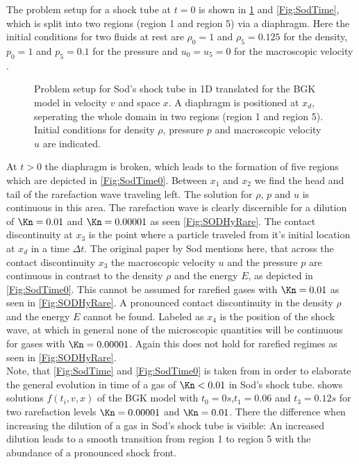 The problem setup for a shock tube at \(t=0\) is shown in \cref{Fig:SodProbSetup} and \cref{Fig:SodTime}, which is split into two regions (region 1 and region 5) via a diaphragm. Here the initial conditions for two fluids at rest are \(\rho_0 = 1\) and \(\rho_5=0.125\) for the density, \(p_0=1\) and \(p_5=0.1\) for the pressure and \(u_0=u_5=0\) for the macroscopic velocity \cite{Sod}.
\begin{figure}[H]
	\centering
	
	\caption{Problem setup for Sod's shock tube in 1D translated for the BGK model in velocity \(v\) and space \(x\). A diaphragm is positioned at \(x_d\), seperating the whole domain in two regions (region 1 and region 5). Initial conditions for density \(\rho\), pressure \(p\) and macroscopic velocity \(u\) are indicated.}
	\label{Fig:SodProbSetup}
\end{figure}
At \(t>0\) the diaphragm is broken, which leads to the formation of five regions which are depicted in \cref{Fig:SodTime0}. Between \(x_1\) and \(x_2\) we find the head and tail of the rarefaction wave traveling left. The solution for \(\rho\), \(p\) and \(u\) is continuous in this area. The rarefaction wave is clearly discernible for a dilution of \(\Kn=0.01\) and \(\Kn=0.00001\) as seen \cref{Fig:SODHyRare}. The contact discontinuity at \(x_3\) is the point where a particle traveled from it's initial location at \(x_d\) in a time \(\Delta t\). The original paper by Sod mentions here, that across the contact discontinuity \(x_3\) the macroscopic velocity \(u\) and the pressure \(p\) are continuous in  contrast to the density \(\rho\) and the energy \(E\), as depicted in \cref{Fig:SodTime0}. This cannot be assumed for rarefied gases with \(\Kn=0.01\) as seen in \cref{Fig:SODHyRare}. A pronounced contact discontinuity in the density \(\rho\) and the energy \(E\) cannot be found. Labeled as \(x_4\) is the position of the shock wave, at which in general none of the microscopic quantities will be continuous for gases with \(\Kn=0.00001\). Again this does not hold for rarefied regimes as seen in \cref{Fig:SODHyRare}.\\
Note, that \cref{Fig:SodTime} and \cref{Fig:SodTime0} is taken from \cite{Sod} in order to elaborate the general evolution in time of a gas of \(\Kn<0.01\) in Sod's shock tube.  shows solutions \(f(t_i,v,x)\) of the BGK model with \(t_0=0s\),\(t_1=0.06\) and \(t_3=0.12s\) for two rarefaction levels \(\Kn=0.00001\) and \(\Kn=0.01\). There the difference when increasing the dilution of a gas in Sod's shock tube is visible: An increased dilution leads to a smooth transition from region 1 to region 5 with the abundance of a pronounced shock front. 
